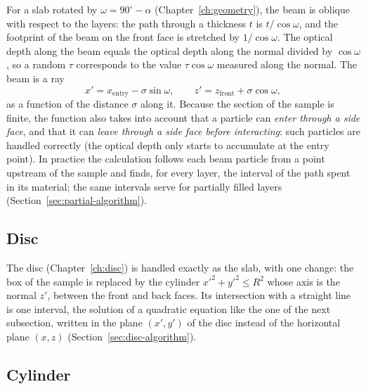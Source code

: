 For a slab rotated by $\omega=90^\circ-\alpha$ (Chapter~\ref{ch:geometry}), the beam is oblique with respect to the layers:
the path through a thickness $t$ is $t/\cos\omega$, and the footprint of the beam on the front face is stretched by
$1/\cos\omega$. The optical depth along the beam equals the optical depth along the normal divided by $\cos\omega$, so a random
$\tau$ corresponds to the value $\tau\cos\omega$ measured along the normal. The beam is a ray
\begin{equation}
  x' = x_\mathrm{entry}-\sigma\sin\omega,\qquad z' = z_\mathrm{front}+\sigma\cos\omega,
\end{equation}
as a function of the distance $\sigma$ along it. Because the section of the sample is finite, the function also
takes into account that a particle can \emph{enter through a side face}, and that it can \emph{leave through a side face before
interacting}: such particles are handled correctly (the optical depth only starts to accumulate at the entry point).
In practice the calculation follows each beam particle from a point upstream of the sample and finds, for every layer, the
interval of the path spent in its material; the same intervals serve for partially filled layers (Section~\ref{sec:partial-algorithm}).

\subsection{Disc}

The disc (Chapter~\ref{ch:disc}) is handled exactly as the slab, with one change: the box of the sample is replaced by the
cylinder $x'^2+y'^2\le R^2$ whose axis is the normal $z'$, between the front and back faces. Its intersection with a straight
line is one interval, the solution of a quadratic equation like the one of the next subsection, written in the plane $(x',y')$
of the disc instead of the horizontal plane $(x,z)$ (Section~\ref{sec:disc-algorithm}).

\subsection{Cylinder}

